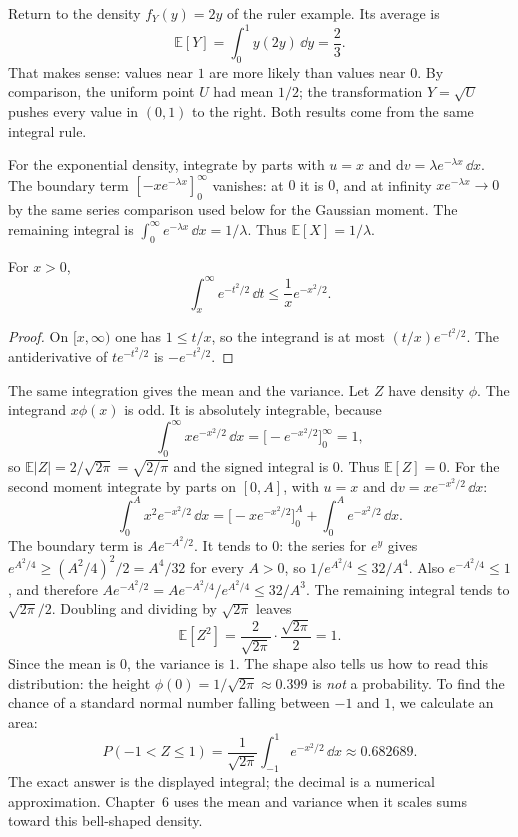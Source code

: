 Return to the density $f_Y(y)=2y$ of the ruler example. Its average is
\[
 \mathbb E[Y]=\int_0^1 y(2y)\,\dd y=\frac23.
\]
That makes sense: values near $1$ are more likely than values near $0$. By comparison, the uniform point $U$ had mean $1/2$; the transformation $Y=\sqrt U$ pushes every value in $(0,1)$ to the right. Both results come from the same integral rule.

For the exponential density, integrate by parts with $u=x$ and $\mathrm dv=\lambda e^{-\lambda x}\,\dd x$. The boundary term $[-x e^{-\lambda x}]_0^{\infty}$ vanishes: at $0$ it is $0$, and at infinity $x e^{-\lambda x}\to0$ by the same series comparison used below for the Gaussian moment. The remaining integral is $\int_0^{\infty}e^{-\lambda x}\,\dd x=1/\lambda$. Thus $\mathbb E[X]=1/\lambda$.

\begin{proposition}\label{prop:gausstail}
For $x>0$,
\[
 \int_x^{\infty}e^{-t^2/2}\,\dd t\le\frac1x e^{-x^2/2}.
\]
\end{proposition}
\begin{proof}
On $[x,\infty)$ one has $1\le t/x$, so the integrand is at most $(t/x)e^{-t^2/2}$. The antiderivative of $t e^{-t^2/2}$ is $-e^{-t^2/2}$.
\end{proof}

The same integration gives the mean and the variance. Let $Z$ have density $\phi$. The integrand $x\phi(x)$ is odd. It is absolutely integrable, because
\[
 \int_0^{\infty} x e^{-x^2/2}\,\dd x=\bigl[-e^{-x^2/2}\bigr]_0^{\infty}=1,
\]
so $\mathbb E|Z|=2/\sqrt{2\pi}=\sqrt{2/\pi}$ and the signed integral is $0$. Thus $\mathbb E[Z]=0$. For the second moment integrate by parts on $[0,A]$, with $u=x$ and $\mathrm dv=x e^{-x^2/2}\,\dd x$:
\[
 \int_0^A x^2 e^{-x^2/2}\,\dd x=\bigl[-x e^{-x^2/2}\bigr]_0^A+\int_0^A e^{-x^2/2}\,\dd x.
\]
The boundary term is $A e^{-A^2/2}$. It tends to $0$: the series for $e^y$ gives $e^{A^2/4}\ge (A^2/4)^2/2=A^4/32$ for every $A>0$, so $1/e^{A^2/4}\le 32/A^4$. Also $e^{-A^2/4}\le 1$, and therefore $A e^{-A^2/2}=A e^{-A^2/4}/e^{A^2/4}\le 32/A^3$. The remaining integral tends to $\sqrt{2\pi}/2$. Doubling and dividing by $\sqrt{2\pi}$ leaves
\[
 \mathbb E[Z^2]=\frac{2}{\sqrt{2\pi}}\cdot\frac{\sqrt{2\pi}}{2}=1.
\]
Since the mean is $0$, the variance is $1$. The shape also tells us how to read this distribution: the height $\phi(0)=1/\sqrt{2\pi}\approx0.399$ is \emph{not} a probability. To find the chance of a standard normal number falling between $-1$ and $1$, we calculate an area:
\[
 P(-1<Z\le1)=\frac1{\sqrt{2\pi}}\int_{-1}^{1}e^{-x^2/2}\,\dd x
 \approx0.682689.
\]
The exact answer is the displayed integral; the decimal is a numerical approximation. Chapter~6 uses the mean and variance when it scales sums toward this bell-shaped density.

